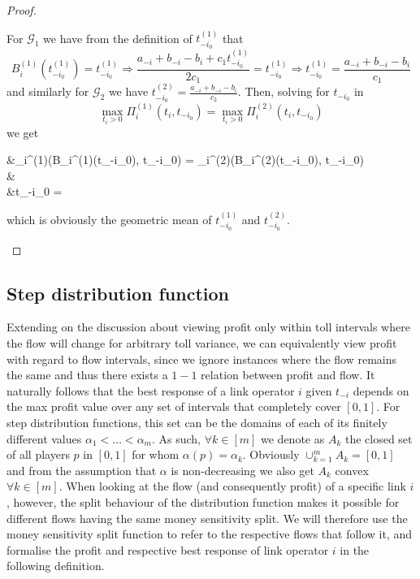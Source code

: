 \documentclass[10pt,a4paper]{book}
\newcommand{\Gm}{\mathcal{G}}
\theoremstyle{definition}
\theoremstyle{comment}
\begin{document}
\begin{proof}
\begin{enumerate}[$(i)$]
		For $\Gm_1$ we have from the definition of $t_{-i_0}^{(1)}$ that
		\[
			B_i^{(1)}(t_{-i_0}^{(1)}) = t_{-i_0}^{(1)} \Rightarrow \frac{a_{-i} + b_{-i} - b_i + c_1 t_{-i_0}^{(1)}}{2 c_1} = t_{-i_0}^{(1)} \Rightarrow t_{-i_0}^{(1)} = \frac{a_{-i} + b_{-i} - b_i}{c_1}
		\]
		and similarly for $\Gm_2$ we have $t_{-i_0}^{(2)} = \frac{a_{-i} + b_{-i} - b_i}{c_2}$.
		Then, solving for $t_{-i_0}$ in
		\[\max_{t_i > 0}\Pi_i^{(1)}(t_i, t_{-i_0}) = \max_{t_i > 0}\Pi_i^{(2)}(t_i, t_{-i_0})\]
		we get
		\begin{flalign*}
			&\Pi_i^{(1)}(B_i^{(1)}(t_{-i_0}), t_{-i_0}) = \Pi_i^{(2)}(B_i^{(2)}(t_{-i_0}), t_{-i_0}) \\
			\Rightarrow &\cdots \\
			\Rightarrow &t_{-i_0} = 
		\end{flalign*}
		which is obviously the geometric mean of $t_{-i_0}^{(1)}$ and $t_{-i_0}^{(2)}$.
	\end{enumerate}
\end{proof}

\subsection*{Step distribution function}

Extending on the discussion about viewing profit only within toll intervals where the flow will change for arbitrary toll variance, we can equivalently view profit with regard to flow intervals, since we ignore instances where the flow remains the same and thus there exists a $1-1$ relation between profit and flow.
It naturally follows that the best response of a link operator $i$ given $t_{-i}$ depends on the max profit value over any set of intervals that completely cover $[0, 1]$.
For step distribution functions, this set can be the domains of each of its finitely different values $\alpha_1 < \ldots < \alpha_m$.
As such, $\forall k \in [m]$ we denote as $A_k$ the closed set of all players $p$ in $[0, 1]$ for whom $\alpha(p) = \alpha_k$.
Obviously $\cup_{k=1}^m A_k = [0, 1]$ and from the assumption that $\alpha$ is non-decreasing we also get $A_k$ convex $\forall k \in [m]$.
When looking at the flow (and consequently profit) of a specific link $i$, however, the split behaviour of the distribution function makes it possible for different flows having the same money sensitivity split.
We will therefore use the money sensitivity split function to refer to the respective flows that follow it, and formalise the profit and respective best response of link operator $i$ in the following definition.
\end{document}
